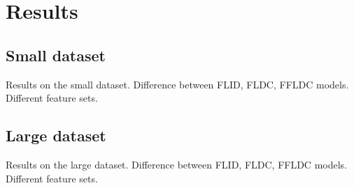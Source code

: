 \chapter{Results}
\label{sec:results}

\section{Small dataset}

Results on the small dataset. Difference between FLID, FLDC, FFLDC models. Different feature sets.

\section{Large dataset}

Results on the large dataset. Difference between FLID, FLDC, FFLDC models. Different feature sets.